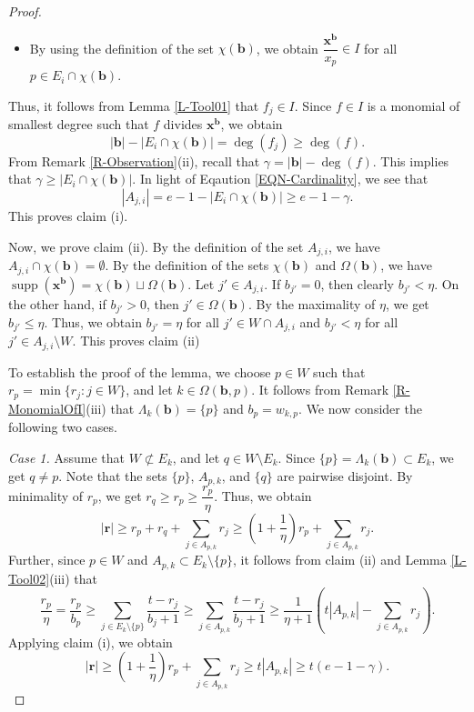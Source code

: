 \documentclass[12pt,reqno]{amsart}
\theoremstyle{definition}
\newcommand{\x}{\mathbf{x}}
\newcommand{\bb}{\mathbf{b}}
\newcommand{\br}{\mathbf{r}}
\newcommand{\C}{\chi}
\newcommand{\Om}{\Omega}
\newcommand{\Lm}{\Lambda}
\newcommand{\supp}[1]{\operatorname{supp}\left(#1\right)}
\numberwithin{equation}{section}
\begin{document}
\begin{proof}
\begin{itemize}
        \vspace{1.5mm}

        \item By using the definition of the set $\C(\bb)$, we obtain $\dfrac{\x^{\bb}}{x_p} \in I$ for all $p \in E_i \cap \C(\bb).$
    \end{itemize}
    Thus, it follows from Lemma \ref{L-Tool01} that $f_j \in I.$ Since $f \in I$ is a monomial of smallest degree such that $f$ divides $\x^{\bb}$, we obtain \[|\bb| - |E_i \cap \C(\bb)| = \deg(f_j) \ge \deg(f).\]
    From Remark \ref{R-Observation}(ii), recall that $\gamma = |\bb| - \deg(f).$ This implies that $\gamma \ge |E_i \cap \C(\bb)|.$ In light of Eqaution \ref{EQN-Cardinality}, we see that
    \[|A_{j, i}| = e - 1 - |E_i \cap \C(\bb)| \ge e - 1 - \gamma.\]
    This proves claim (i).
    
    Now, we prove claim (ii). By the definition of the set $A_{j, i}$, we have $A_{j, i} \cap \C(\bb) = \emptyset.$ By the definition of the sets $\C(\bb)$ and $\Om(\bb)$, we have $\supp{\x^{\bb}} = \C(\bb) \sqcup \Om(\bb).$ Let $j' \in A_{j, i}.$ If $b_{j'} = 0$, then clearly $b_{j'} < \eta.$ On the other hand, if $b_{j'} > 0$, then $j' \in \Om(\bb).$ By the maximality of $\eta$, we get $b_{j'} \le \eta.$ Thus, we obtain $b_{j'} = \eta$ for all $j' \in W \cap A_{j, i}$ and $b_{j'} < \eta$ for all $j' \in A_{j, i} \setminus W.$ This proves claim (ii)

    To establish the proof of the lemma, we choose $p \in W$ such that $r_p = \min \{r_j : j \in W\}$, and let $k \in \Om(\bb, p).$ It follows from Remark \ref{R-MonomialOfI}(iii) that $\Lm_k(\bb) = \{p\}$ and $b_p = w_{k, p}.$ We now consider the following two cases.

    \medskip\noindent
    \textit{Case 1.} Assume that $W \not\subset E_k$, and let $q \in W \setminus E_k.$ Since $\{p\} = \Lm_k(\bb) \subset E_k$, we get $q \ne p.$ Note that the sets $\{p\}$, $A_{p, k}$, and $\{q\}$ are pairwise disjoint. By minimality of $r_p$, we get $r_q \ge r_p \ge \dfrac{r_p}{\eta}.$ Thus, we obtain
    \[|\br| \ge r_p + r_q + \sum_{j \in A_{p, k}} r_j \ge \left( 1 + \dfrac{1}{\eta} \right) r_p + \sum_{j \in A_{p, k}} r_j.\]
    Further, since $p \in W$ and $A_{p, k} \subset E_k \setminus \{p\}$, it follows from claim (ii) and Lemma \ref{L-Tool02}(iii) that
    \[\dfrac{r_p}{\eta} = \dfrac{r_p}{b_p} \ge \sum_{j \in E_k \setminus \{p\}} \dfrac{t - r_j}{b_j + 1} \ge \sum_{j \in A_{p, k}}\dfrac{t - r_j}{b_j + 1} \ge \dfrac{1}{\eta + 1} \left( t |A_{p, k}| - \sum_{j \in A_{p, k}} r_j \right).\]
    Applying claim (i), we obtain
    \[|\br| \ge \left( 1 + \dfrac{1}{\eta} \right) r_p + \sum_{j \in A_{p, k}} r_j \ge t |A_{p, k}| \ge t(e - 1 - \gamma).\]


\end{proof}
\end{document}
